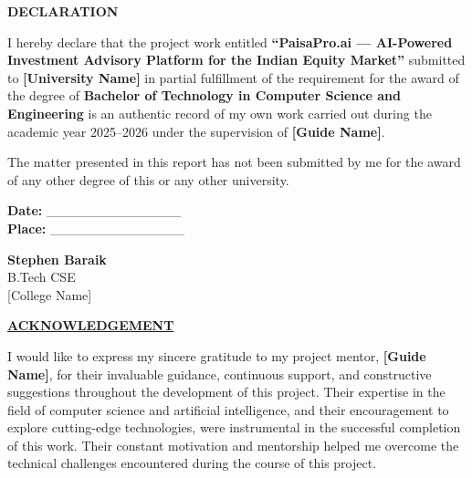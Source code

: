 \documentclass[12pt, a4paper, oneside]{report}
\newcommand{\projectname}{PaisaPro.ai}
\begin{document}
\newpage
\begin{center}
{\LARGE \textbf{DECLARATION}}\\[1.5cm]
\end{center}

I hereby declare that the project work entitled \textbf{``\projectname{} --- AI-Powered Investment Advisory Platform for the Indian Equity Market''} submitted to \textbf{[University Name]} in partial fulfillment of the requirement for the award of the degree of \textbf{Bachelor of Technology in Computer Science and Engineering} is an authentic record of my own work carried out during the academic year 2025--2026 under the supervision of \textbf{[Guide Name]}.

\vspace{0.8cm}
The matter presented in this report has not been submitted by me for the award of any other degree of this or any other university.

\vspace{3cm}

\noindent
\begin{minipage}{0.45\textwidth}
\textbf{Date:} \_\_\_\_\_\_\_\_\_\_\_\_\_\_\\[1cm]
\textbf{Place:} \_\_\_\_\_\_\_\_\_\_\_\_\_\_
\end{minipage}
\hfill
\begin{minipage}{0.45\textwidth}
\raggedleft
\textbf{Stephen Baraik}\\
B.Tech CSE\\
{[College Name]}
\end{minipage}

\newpage
\begin{center}
{\LARGE \textbf{\underline{ACKNOWLEDGEMENT}}}\\[1.5cm]
\end{center}

\noindent
I would like to express my sincere gratitude to my project mentor, \textbf{[Guide Name]}, for their invaluable guidance, continuous support, and constructive suggestions throughout the development of this project. Their expertise in the field of computer science and artificial intelligence, and their encouragement to explore cutting-edge technologies, were instrumental in the successful completion of this work. Their constant motivation and mentorship helped me overcome the technical challenges encountered during the course of this project.
\end{document}
